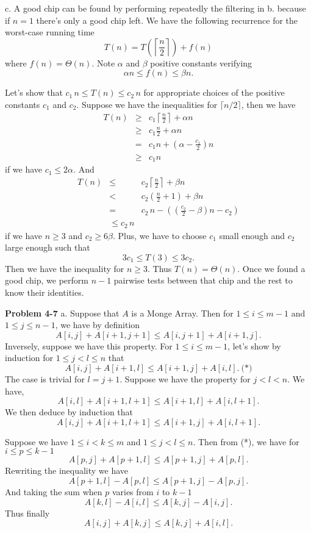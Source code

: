 \documentclass[a4paper,12pt]{article}
\newcommand{\newprob}[1]
{\bigskip \noindent \textbf{Problem #1} \newline}
\newcommand{\subpar}[1]{\medskip \noindent #1.}
\begin{document}
\subpar{c}  A good chip can be found by performing repeatedly the
filtering in b. because if $n=1$ there's only a good chip left.  We
have the following recurrence for the worst-case running time
\[ T(n) = T\left(\left\lceil \frac{n}{2}\right\rceil\right) +
f(n)\] where $f(n) = \Theta(n).$  Note $\alpha$ and $\beta$ positive
constants verifying
\[ \alpha n\le f(n) \le \beta n.\]

Let's show that $c_1\,n \le T(n) \le c_2\,n$ for appropriate choices
of the positive constants $c_1$ and $c_2$.  Suppose we have the
inequalities for $\lceil n/2\rceil$, then we have
\begin{eqnarray*}
  T(n) &\ge& c_1\left\lceil\frac{n}{2}\right\rceil + \alpha n \\
  &\ge& c_1\frac{n}{2} + \alpha n \\
  &=& c_1 n + \left(\alpha - \frac{c_1}{2}\right)n \\
  &\ge& c_1 n
\end{eqnarray*}
if we have $c_1 \le 2\alpha$. And
\begin{eqnarray*}
  T(n) &\le& c_2\left\lceil\frac{n}{2}\right\rceil + \beta n\\
  &<& c_2\left(\frac{n}{2} + 1\right) + \beta n \\
  &=& c_2\,n - \left(\left(\frac{c_2}{2} - \beta\right)n - c_2\right)
  \\
  &\le c_2\,n 
\end{eqnarray*}
if we have $n \ge 3$ and $c_2 \ge 6\beta$.  Plus, we have to choose
$c_1$ small enough and $c_2$ large enough such that
\[ 3c_1 \le T(3) \le 3c_2.\]
Then we have the inequality for $n \ge 3$.  Thus $T(n) = \Theta(n)$.
Once we found a good chip, we perform $n-1$ pairwise tests
between that chip and the rest to know their identities.

\newprob{4-7}
\subpar{a} Suppose that $A$ is a Monge Array.  Then for $1\le i\le m-1$
and $1\le j\le n-1$, we have by definition
\[ A[i,j] + A[i+1,j+1] \le A[i,j+1] + A[i+1,j].\]
Inversely, suppose we have this property.  For $1\le i \le m-1$, let's
show by induction for $1\le j < l \le n$ that
\[ A[i, j] + A[i+1, l] \le A[i+1, j] + A[i, l].\ \mbox{(*)}\]
The case is trivial for $l = j+1$.  Suppose we have the property for
$j<l < n$.  We have,
\[ A[i, l] + A[i+1, l+1] \le A[i+1, l] + A[i, l+1].\]
We then deduce by induction that
\[ A[i, j] + A[i+1, l+1] \le A[i+1, j] + A[i, l+1].\]

\medskip
Suppose we have $1 \le i < k \le m$ and $1 \le j<l \le n$.  Then from
(*), we have for $i\le p\le k-1$
\[ A[p, j] + A[p+1, l] \le A[p+1, j] + A[p, l].\]
Rewriting the inequality we have
\[ A[p+1, l] - A[p, l] \le A[p+1, j] - A[p, j].\]
And taking the sum when $p$ varies from $i$ to $k-1$
\[ A[k, l] - A[i, l] \le A[k, j] - A[i, j].\]
Thus finally
\[ A[i, j] + A[k, j] \le A[k, j] + A[i, l].\]
\end{document}
